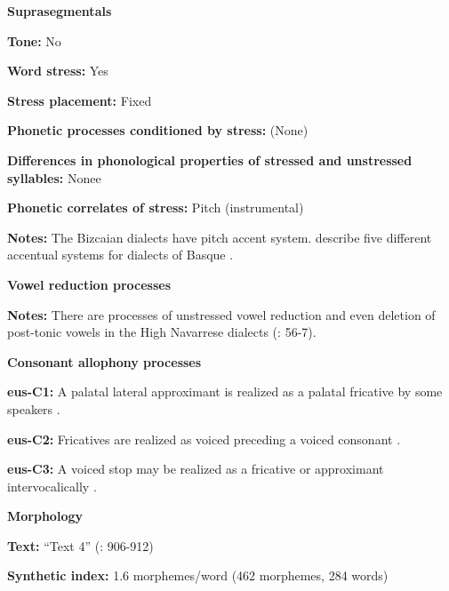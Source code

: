 \textbf{Suprasegmentals}



\textbf{Tone:} No



\textbf{Word stress:} Yes



\textbf{Stress placement:} Fixed



\textbf{Phonetic processes conditioned by stress:} (None)



\textbf{Differences in phonological properties of stressed and unstressed syllables:} Nonee



\textbf{Phonetic correlates of stress:} Pitch (instrumental)



\textbf{Notes:} The Bizcaian dialects have pitch accent system. \citet[282--283]{SaltarelliEtAl1988} describe five different accentual systems for dialects of Basque .



\textbf{Vowel reduction processes}



\textbf{Notes:} There are processes of unstressed vowel reduction and even deletion of post-tonic vowels in the High Navarrese dialects (\citealt{HualdeUrbina2003}: 56-7).



\textbf{Consonant allophony processes}



\textbf{eus-C1:} A palatal lateral approximant is realized as a palatal fricative by some speakers \citep[29]{Hualde2003}.



\textbf{eus-C2:} Fricatives are realized as voiced preceding a voiced consonant \citep[24]{Hualde2003}.



\textbf{eus-C3:} A voiced stop may be realized as a fricative or approximant intervocalically \citep[19]{Hualde2003}.



\textbf{Morphology}



\textbf{Text:} “Text 4” (\citealt{HualdeUrbina2003}: 906-912)



\textbf{Synthetic index:} 1.6 morphemes/word (462 morphemes, 284 words)



